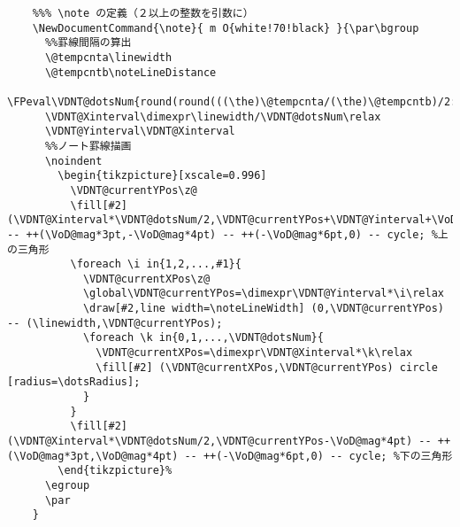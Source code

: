 \documentclass[a4paper,12pt]{article}
\begin{document}
\begin{lstlisting}
    %%% \note の定義（２以上の整数を引数に）
    \NewDocumentCommand{\note}{ m O{white!70!black} }{\par\bgroup
      %%罫線間隔の算出
      \@tempcnta\linewidth
      \@tempcntb\noteLineDistance
      \FPeval\VDNT@dotsNum{round(round(((\the)\@tempcnta/(\the)\@tempcntb)/2:0)*2:0)}%
      \VDNT@Xinterval\dimexpr\linewidth/\VDNT@dotsNum\relax
      \VDNT@Yinterval\VDNT@Xinterval
      %%ノート罫線描画
      \noindent
        \begin{tikzpicture}[xscale=0.996]
          \VDNT@currentYPos\z@
          \fill[#2] (\VDNT@Xinterval*\VDNT@dotsNum/2,\VDNT@currentYPos+\VDNT@Yinterval+\VoD@mag*4pt) -- ++(\VoD@mag*3pt,-\VoD@mag*4pt) -- ++(-\VoD@mag*6pt,0) -- cycle; %上の三角形
          \foreach \i in{1,2,...,#1}{ 
            \VDNT@currentXPos\z@
            \global\VDNT@currentYPos=\dimexpr\VDNT@Yinterval*\i\relax
            \draw[#2,line width=\noteLineWidth] (0,\VDNT@currentYPos) -- (\linewidth,\VDNT@currentYPos);
            \foreach \k in{0,1,...,\VDNT@dotsNum}{
              \VDNT@currentXPos=\dimexpr\VDNT@Xinterval*\k\relax
              \fill[#2] (\VDNT@currentXPos,\VDNT@currentYPos) circle [radius=\dotsRadius];
            }
          }
          \fill[#2] (\VDNT@Xinterval*\VDNT@dotsNum/2,\VDNT@currentYPos-\VoD@mag*4pt) -- ++(\VoD@mag*3pt,\VoD@mag*4pt) -- ++(-\VoD@mag*6pt,0) -- cycle; %下の三角形
        \end{tikzpicture}%
      \egroup
      \par
    }



\end{lstlisting}
\end{document}

